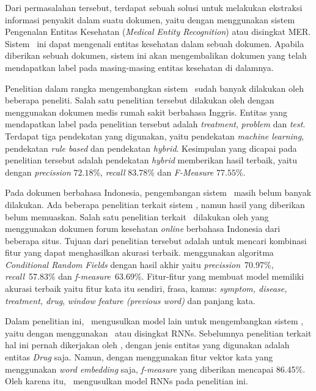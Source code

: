 	Dari permasalahan tersebut, terdapat sebuah solusi untuk melakukan ekstraksi informasi penyakit dalam suatu dokumen, yaitu dengan menggunakan sistem Pengenalan Entitas Kesehatan (\textit{Medical Entity Recognition}) atau disingkat MER. Sistem \mer~ini dapat mengenali entitas kesehatan dalam sebuah dokumen. Apabila diberikan sebuah dokumen, sistem ini akan mengembalikan dokumen yang telah mendapatkan label pada masing-masing entitas kesehatan di dalamnya.
	
	Penelitian dalam rangka mengembangkan sistem \mer~sudah banyak dilakukan oleh beberapa peneliti. Salah satu penelitian tersebut dilakukan oleh \cite{abacha2011medical} dengan menggunakan dokumen medis rumah sakit berbahasa Inggris. Entitas yang mendapatkan label pada penelitian tersebut adalah \textit{treatment}, \textit{problem} dan \textit{test}. Terdapat tiga pendekatan yang digunakan, yaitu pendekatan \textit{machine learning}, pendekatan \textit{rule based} dan pendekatan \textit{hybrid}. Kesimpulan yang dicapai pada penelitian tersebut adalah pendekatan \textit{hybrid} memberikan hasil terbaik, yaitu dengan \textit{precission} $ 72.18\% $, \textit{recall} $ 83.78\% $ dan \textit{F-Measure} $ 77.55\% $.
		
	Pada dokumen berbahasa Indonesia, pengembangan sistem \mer~masih belum banyak dilakukan. Ada beberapa penelitian terkait sistem \mer, namun hasil yang diberikan belum memuaskan. Salah satu penelitian terkait \mer~dilakukan oleh \cite{skripsiKakRadit} yang menggunakan dokumen forum kesehatan \textit{online} berbahasa Indonesia dari beberapa situs. Tujuan dari penelitian tersebut adalah untuk mencari kombinasi fitur yang dapat menghasilkan akurasi terbaik. \cite{skripsiKakRadit} menggunakan algoritma \textit{Conditional Random Fields} dengan hasil akhir yaitu \textit{precission}~70.97\%, \textit{recall}~57.83\% dan \textit{f-measure}~63.69\%. Fitur-fitur yang membuat model memiliki akurasi terbaik yaitu fitur kata itu sendiri, frasa, kamus: \textit{symptom, disease, treatment, drug}, \textit{window feature (previous word)} dan panjang kata.

	Dalam penelitian ini, \saya~mengusulkan model lain untuk mengembangkan sistem \mer, yaitu dengan menggunakan \rnn~atau disingkat RNNs. Sebelumnya penelitian terkait hal ini pernah dikerjakan oleh \cite{mujiono2016new}, dengan jenis entitas yang digunakan adalah entitas \textit{Drug} saja. Namun, dengan menggunakan fitur vektor kata yang menggunakan \textit{word embedding} saja, \textit{f-measure} yang diberikan mencapai 86.45\%. Oleh karena itu, \saya~mengusulkan model RNNs pada penelitian ini.
		
